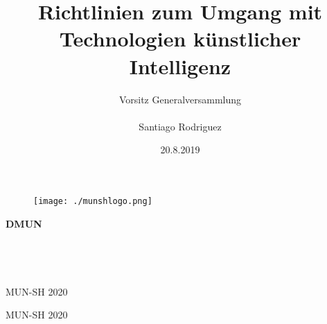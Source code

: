 \documentclass[a4paper,11pt]{article}
\title{Richtlinien zum Umgang mit Technologien künstlicher Intelligenz}
\author{Vorsitz Generalversammlung \\ \\ Santiago Rodriguez}
\date{20.8.2019}
\begin{document}
	\begin{titlepage}
		\thispagestyle{empty}
		\begin{figure}
			\texttt{[image: ./munshlogo.png]}
		\end{figure}
		\vspace*{-43mm}\hspace{-6mm}\textbf{\textcolor{pantone294}{\large{DMUN}}}\\\\\\\\\\
		\textcolor{pantone294}{MUN-SH 2020}\\
		\vspace{30mm}
		\begin{center}
			\textcolor{pantone294}{\huge{MUN-SH 2020}}\\\vspace*{7mm}
			\textcolor{pantone294}{\huge{\textbf{\thetitle}}}\\\vspace*{10mm}
			\textcolor{pantone294}{\theauthor}\\\vspace*{10mm}
			\textcolor{pantone294}{\thedate}\\\vspace*{20mm}
		\end{center}
	\end{titlepage}
	\makeatother
	\restoregeometry
	\newpage
	
	\tableofcontents
\vspace{2cm}
	
	
\end{document}
